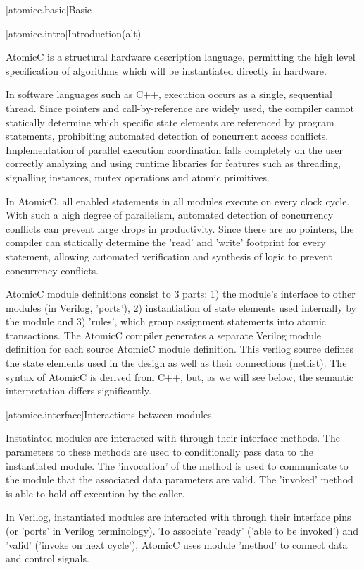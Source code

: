 [atomicc.basic]{Basic}

[atomicc.intro]{Introduction(alt)}

AtomicC is a structural hardware description language, permitting
the high level specification of algorithms which will be instantiated
directly in hardware.

In software languages such as C++, execution occurs as a single, sequential thread.
Since pointers and call-by-reference are widely used,
the compiler cannot statically
determine which specific state elements are referenced by program
statements, prohibiting automated detection of concurrent access conflicts.
Implementation of parallel execution coordination falls completely
on the user correctly analyzing and using runtime libraries for features such as
threading, signalling instances, mutex operations and atomic primitives.

In AtomicC, all enabled statements in all modules execute on every clock cycle.
With such a high degree of parallelism, automated detection of concurrency
conflicts can prevent large drops in productivity.
Since there are no pointers, the compiler can statically determine the 'read' and 'write'
footprint for every statement, allowing automated verification and
synthesis of logic to prevent concurrency conflicts.

AtomicC module definitions consist to 3 parts: 1) the module's interface to other
modules (in Verilog, 'ports'), 2) instantiation
of state elements used internally by the module and 3) 'rules', which group
assignment statements into atomic transactions.
The AtomicC compiler generates a separate Verilog module definition
for each source AtomicC module definition.
This verilog source defines the state elements
used in the design as well as their connections (netlist).
The syntax of AtomicC is derived from C++, but, as we will see below,
the semantic interpretation differs significantly.

[atomicc.interface]{Interactions between modules}

Instatiated modules are interacted with through their interface methods.  The parameters
to these methods are used to conditionally pass data to the instantiated module.
The 'invocation' of the method is used to communicate to the module that the associated
data parameters are valid.  The 'invoked' method is able to hold off execution by the
caller.

In Verilog, instantiated modules are interacted with through their interface pins
(or 'ports' in Verilog terminology).  To associate 'ready' ('able to be invoked')
and 'valid' ('invoke on next cycle'), AtomicC uses module 'method' to connect data
and control signals.

